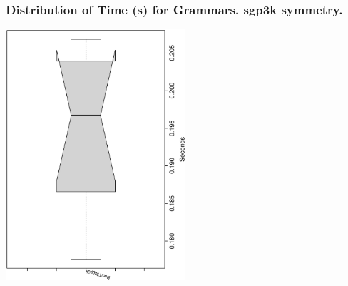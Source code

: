  \begin{frame}
 \frametitle{ Distribution of Time (s) for Grammars. sgp3k  symmetry. }
 \begin{center}
\includegraphics[width=0.5\textwidth, angle=-90]
{ExpFboxplottSeconds001.eps}
 \end{center}
 \label{ExpFboxplottSeconds001.eps}  
 \end{frame}

